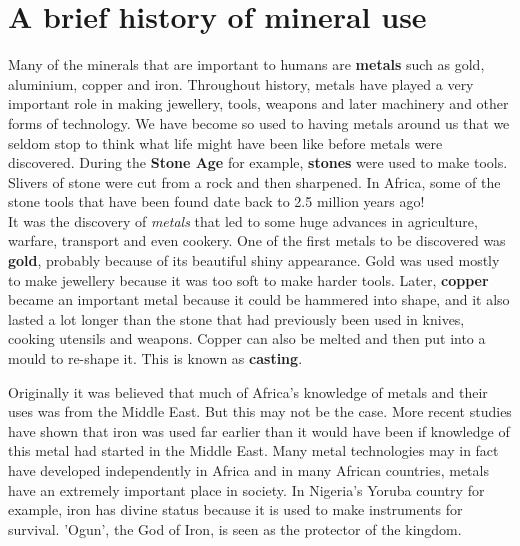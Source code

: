 



\section{A brief history of mineral use}

Many of the minerals that are important to humans are \textbf{metals} such as gold, aluminium, copper and iron. Throughout history, metals have played a very important role in making jewellery, tools, weapons and later machinery and other forms of technology. We have become so used to having metals around us that we seldom stop to think what life might have been like before metals were discovered. During the \textbf{Stone Age} for example, \textbf{stones} were used to make tools. Slivers of stone were cut from a rock and then sharpened. In Africa, some of the stone tools that have been found date back to 2.5 million years ago! \\

It was the discovery of \textit{metals} that led to some huge advances in agriculture, warfare, transport and even cookery. One of the first metals to be discovered was \textbf{gold}, probably because of its beautiful shiny appearance. Gold was used mostly to make jewellery because it was too soft to make harder tools. Later, \textbf{copper} became an important metal because it could be hammered into shape, and it also lasted a lot longer than the stone that had previously been used in knives, cooking utensils and weapons. Copper can also be melted and then put into a mould to re-shape it. This is known as \textbf{casting}. \\

\begin{IFact}{
Originally it was believed that much of Africa's knowledge of metals and their uses was from the Middle East. But this may not be the case. More recent studies have shown that iron was used far earlier than it would have been if knowledge of this metal had started in the Middle East. Many metal technologies may in fact have developed independently in Africa and in many African countries, metals have an extremely important place in society. In Nigeria's Yoruba country for example, iron has divine status because it is used to make instruments for survival. 'Ogun', the God of Iron, is seen as the protector of the kingdom.
}
\end{IFact}

